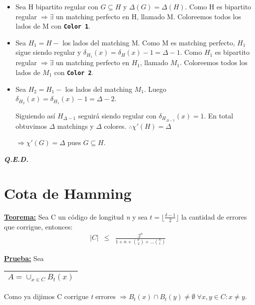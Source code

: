 \documentclass[12pt,a4paper]{report}
\newcounter{neq}
\newcommand{\QED}{\hfill \textit{\textbf{Q.E.D.}}}
\begin{document}
			\vspace{5mm}
			\begin{itemize}
				\item Sea H bipartito regular con $G \subseteq H$ y $\Delta(G) = \Delta(H)$. Como H es bipartito regular $\Rightarrow \exists$ un matching perfecto en H, llamado M. Coloreemos todos los lados de M con \textbf{\texttt{Color 1}}.
				\item Sea $H_{1} = H - $ los lados del matching M. Como M es matching perfecto, $H_{1}$ sigue siendo regular y $\delta_{H_{1}}(x) = \delta_{H}(x) - 1 = \Delta - 1$. Como $H_{1}$ es bipartito regular $\Rightarrow \exists$ un matching perfecto en $H_{1}$, llamado $M_{1}$. Coloreemos todos los lados de $M_{1}$ con \textbf{\texttt{Color 2}}.
				\item Sea $H_{2} = H_{1} - $ los lados del matching $M_{1}$. Luego $\delta_{H_{2}}(x) = \delta_{H_{1}}(x) - 1 = \Delta - 2$.
					\par Siguiendo así $H_{\Delta - 1}$ seguirá siendo regular con $ \delta_{H_{\Delta - 1}}(x) = 1$. En total obtuvimos $ \Delta $ matchings y $ \Delta $ colores. $\therefore \chi '(H) = \Delta$
					\begin{center}
						$\Rightarrow \chi ' (G) = \Delta$ pues $G \subseteq H$.
					\end{center}
			\end{itemize}

		\QED

	\pagebreak
	\section{Cota de Hamming}
		\textbf{\underline{Teorema:}} Sea C un código de longitud \textit{n} y sea $ t = \lfloor \frac{\delta - 1}{2} \rfloor$ la cantidad de errores que corrigue, entonces:
			\begin{eqnarray}
				\nonumber \lvert C \rvert &\leq & \frac{2^{n}}{1 + n + {n \choose 2} + \dotsc {n \choose t}}
			\end{eqnarray}

		\textbf{\underline{Prueba:}} Sea \begin{tabular}{|c|} \hline $ A = \cup_{x \in C} B_{t}(x) $ \\ \hline \end{tabular}

			\vspace{3mm}
				\par Como ya dijimos C corrigue \textit{t} errores $\Rightarrow B_{t}(x) \cap B_{t}(y) \neq \emptyset \; \forall x, y \in C : x \neq y$.
\end{document}

